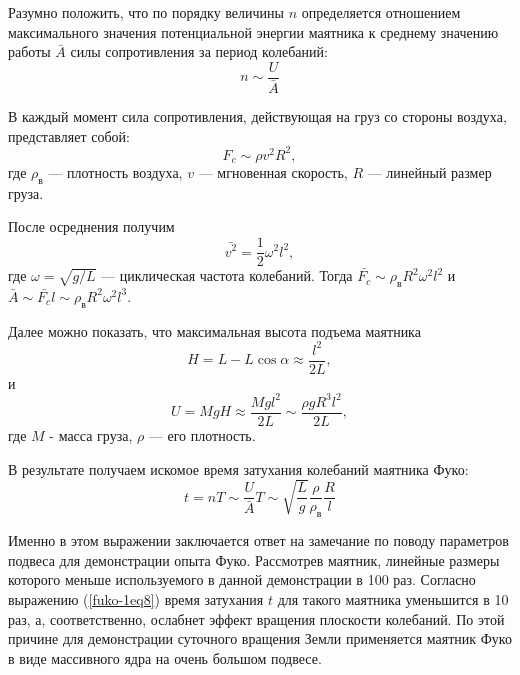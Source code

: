 \documentclass[14pt,a4paper,oneside]{extarticle}	%
\begin{document}
	Разумно положить, что по порядку величины $ n $ определяется отношением максимального значения потенциальной энергии маятника к среднему значению работы $ \bar{A} $ силы сопротивления за период колебаний:
	 \begin{equation}\label{fuko-1eq3}
	 n \sim \frac{U}{\bar{A}}
	 \end{equation}
	 
	В каждый момент сила сопротивления, действующая на груз со стороны воздуха, представляет собой:
	\begin{equation}\label{fuko-1eq4}
	F_{c} \sim \rho v^{2}R^{2},
	\end{equation}
	где $ \rho_{\text{в}} $ — плотность воздуха, $ v $ — мгновенная скорость, $ R $ — линейный размер груза.
	
	После осреднения получим
	\begin{equation}\label{fuko-1eq5}
	\bar{v^{2}} = \frac{1}{2}\omega^{2}l^{2},
	\end{equation}
	где $ \omega = \sqrt{g/L} $ — циклическая частота колебаний.
	Тогда $ \bar{F_{c}}  \sim \rho_{\text{в}} R^{2}\omega^{2}l^{2} $ и $ \bar{A} \sim  \bar{F_{c}} l \sim \rho_{\text{в}} R^{2}\omega^{2}l^3 $.
	
	Далее можно показать, что максимальная высота подъема маятника
	\begin{equation}\label{fuko-1eq6}
	H = L - L \cos\alpha \approx \frac{l^{2}}{2L},
	\end{equation}
	и
	\begin{equation}\label{fuko-1eq7}
	U = MgH \approx \frac{ Mgl^2}{2L} \sim \frac{\rho g R^{3}l^{2}}{2L},
	\end{equation}
	где $ M $ - масса груза, $ \rho $ — его плотность. 
	
	В результате получаем искомое время затухания колебаний маятника Фуко:
	\begin{equation}\label{fuko-1eq8}
	t = nT \sim  \frac{U}{\bar{A}}T \sim\sqrt{\frac{L}{g}} \frac{\rho}{\rho_{\text{в}}}\frac{R}{l}
	\end{equation}
	
	Именно в этом выражении заключается ответ на замечание по поводу параметров подвеса для демонстрации опыта Фуко.
	Рассмотрев маятник, линейные размеры которого меньше используемого в данной демонстрации в 100 раз.
	Согласно выражению (\ref{fuko-1eq8}) время затухания $ t $ для такого маятника уменьшится в 10 раз, а, соответственно, ослабнет эффект вращения плоскости колебаний.
	По этой причине для демонстрации суточного вращения Земли применяется маятник Фуко в виде массивного ядра на очень большом подвесе.
	
\end{document}

